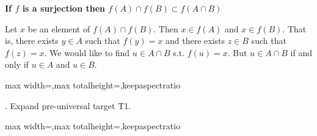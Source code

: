 \documentclass[a4paper,twoside,12pt]{article}
\makeatletter
\DeclareRobustCommand{\_}{%
  \leavevmode\vbox{%
    \hrule\@width.4em
          \@height-.16ex
          \@depth\dimexpr.16ex+.28pt\relax}}
\newcommand\Tstrut{\rule{0pt}{2.4ex}}
\newcommand\Bstrut{\rule[-1.1ex]{0pt}{0pt}}
\newenvironment{fit}{\begin{adjustbox}{max width=\textwidth,max totalheight=\textheight,keepaspectratio}}{\end{adjustbox}}
\makeatother
\begin{document}
{\begin{center} \large \textbf{If $f$ is a surjection then $f(A)\cap f(B)\subset f(A\cap B)$}\end{center}}\nopagebreak[4]

\begin{center}
\begin{minipage}{120mm}
Let $x$ be an element of $f(A)\cap f(B)$. Then $x\in f(A)$ and $x\in f(B)$. That is, there exists $y\in A$ such that $f(y) = x$ and there exists $z\in B$ such that $f(z) = x$. We would like to find $u\in A\cap B$ s.t. $f(u) = x$. But $u\in A\cap B$ if and only if $u\in A$ and $u\in B$.
\end{minipage}
\end{center}

\bigskip
\begin{steps}
\begin{fit}%
\end{fit}
\smallskip

. Expand pre-universal target T1.\nopagebreak[4] 
\marginpar{}\nopagebreak[4] 
\smallskip\nopagebreak[4] 

\begin{fit}%
\end{fit}
\smallskip


\end{steps}
\end{document}
